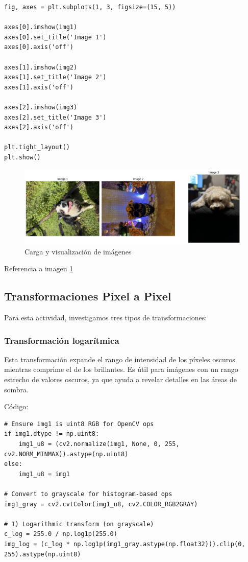 \documentclass[12pt,letterpaper]{article}
\begin{document}
\begin{verbatim}
fig, axes = plt.subplots(1, 3, figsize=(15, 5))

axes[0].imshow(img1)
axes[0].set_title('Image 1')
axes[0].axis('off')

axes[1].imshow(img2)
axes[1].set_title('Image 2')
axes[1].axis('off')

axes[2].imshow(img3)
axes[2].set_title('Image 3')
axes[2].axis('off')

plt.tight_layout()
plt.show()
\end{verbatim}

\begin{figure}[H]
  \centering
  \includegraphics[width=0.8\linewidth]{figuras/carga_imagenes.png}
  \caption{Carga y visualización de imágenes}
  \label{fig:carga_imagenes}
\end{figure}

Referencia a imagen \ref{fig:carga_imagenes}


\subsection{Transformaciones Pixel a Pixel}

Para esta actividad, investigamos tres tipos de transformaciones:


\subsubsection{Transformación logarítmica}

Esta transformación expande el rango de intensidad de los píxeles oscuros mientras comprime el de los brillantes. Es útil para imágenes con un rango estrecho de valores oscuros, ya que ayuda a revelar detalles en las áreas de sombra.


Código:

\begin{verbatim}
# Ensure img1 is uint8 RGB for OpenCV ops
if img1.dtype != np.uint8:
    img1_u8 = (cv2.normalize(img1, None, 0, 255, cv2.NORM_MINMAX)).astype(np.uint8)
else:
    img1_u8 = img1

# Convert to grayscale for histogram-based ops
img1_gray = cv2.cvtColor(img1_u8, cv2.COLOR_RGB2GRAY)

# 1) Logarithmic transform (on grayscale)
c_log = 255.0 / np.log1p(255.0)
img_log = (c_log * np.log1p(img1_gray.astype(np.float32))).clip(0, 255).astype(np.uint8)
\end{verbatim}
\end{document}
